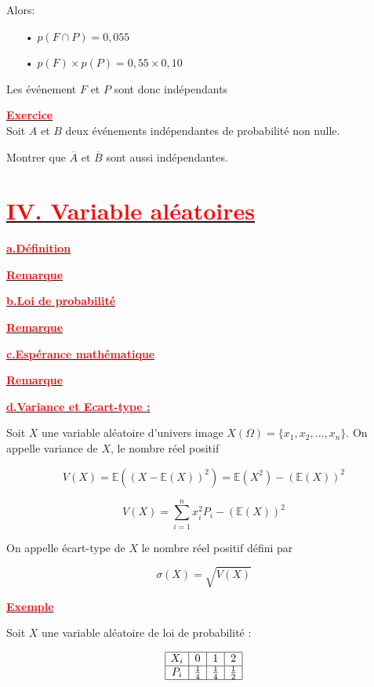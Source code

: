 \documentclass[12pt]{article}
\begin{document}
Alors:
\begin{itemize}
\item[•] $p(F\cap P)=0,055$
\item[•] $p(F)\times p(P)=0,55\times 0,10$
\end{itemize}
Les événement $F$ et $P$ sont donc indépendants

\underline{\textbf{\textcolor{red}{Exercice}}}\\
Soit $A$ et $B$ deux événements indépendantes de probabilité non nulle.

Montrer que $\overline{A}$ et $\overline{B}$ sont aussi indépendantes.
\section*{\underline{\textbf{\textcolor{red}{IV. Variable aléatoires}}}}
\underline{\textbf{\textcolor{red}{a.Définition}}}

\underline{\textbf{\textcolor{red}{Remarque}}}

\underline{\textbf{\textcolor{red}{b.Loi de probabilité}}}

\underline{\textbf{\textcolor{red}{Remarque}}}

\underline{\textbf{\textcolor{red}{c.Espérance mathématique}}}

\underline{\textbf{\textcolor{red}{Remarque}}}

\underline{\textbf{\textcolor{red}{d.Variance et Ecart-type :}}}

Soit \( X \) une variable aléatoire d'univers image \( X(\Omega) = \{ x_1, x_2, \dots, x_n \} \). On appelle variance de \( X \), le nombre réel positif

\[
V(X) = \mathbb{E} \left( (X - \mathbb{E}(X))^2 \right) = \mathbb{E}(X^2) - (\mathbb{E}(X))^2
\]

\[
V(X) = \sum_{i=1}^{n} x_i^2 P_i - (\mathbb{E}(X))^2
\]

On appelle écart-type de \( X \) le nombre réel positif défini par

\[
\sigma(X) = \sqrt{V(X)}
\]

\underline{\textbf{\textcolor{red}{Exemple}}}

Soit \( X \) une variable aléatoire de loi de probabilité :

\[
\begin{array}{|c|c|c|c|}
\hline
X_i & 0 & 1 & 2 \\
\hline
P_i & \frac{1}{4} & \frac{1}{4} & \frac{1}{2} \\
\hline
\end{array}
\]
\end{document}
